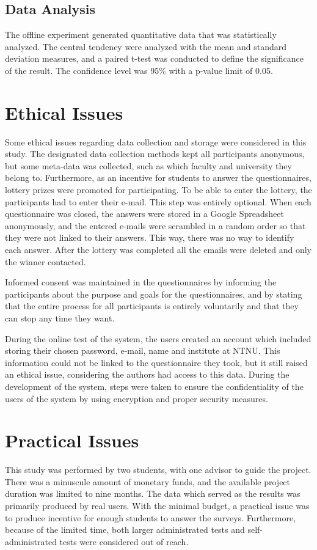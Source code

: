 \subsection*{Data Analysis}
The offline experiment generated quantitative data that was statistically analyzed. The central tendency were analyzed with the mean and standard deviation measures, and a paired t-test was conducted to define the significance of the result. The confidence level was 95\% with a p-value limit of 0.05.

\section{Ethical Issues}
Some ethical issues regarding data collection and storage were considered in this study. The designated data collection methods kept all participants anonymous, but some meta-data was collected, such as which faculty and university they belong to. Furthermore, as an incentive for students to answer the questionnaires, lottery prizes were promoted for participating. To be able to enter the lottery, the participants had to enter their e-mail. This step was entirely optional. When each questionnaire was closed, the answers were stored in a Google Spreadsheet anonymously, and the entered e-mails were scrambled in a random order so that they were not linked to their answers. This way, there was no way to identify each answer. After the lottery was completed all the emails were deleted and only the winner contacted. 

Informed consent was maintained in the questionnaires by informing the participants about the purpose and goals for the questionnaires, and by stating that the entire process for all participants is entirely voluntarily and that they can stop any time they want.

During the online test of the system, the users created an account which included storing their chosen password, e-mail, name and institute at NTNU. This information could not be linked to the questionnaire they took, but it still raised an ethical issue, considering the authors had access to this data. During the development of the system, steps were taken to ensure the confidentiality of the users of the system by using encryption and proper security measures.


\section{Practical Issues}
This study was performed by two students, with one advisor to guide the project. There was a minuscule amount of monetary funds, and the available project duration was limited to nine months. The data which served as the results was primarily produced by real users. With the minimal budget, a practical issue was to produce incentive for enough students to answer the surveys. Furthermore, because of the limited time, both larger administrated tests and self-administrated tests were considered out of reach.

\cleardoublepage




